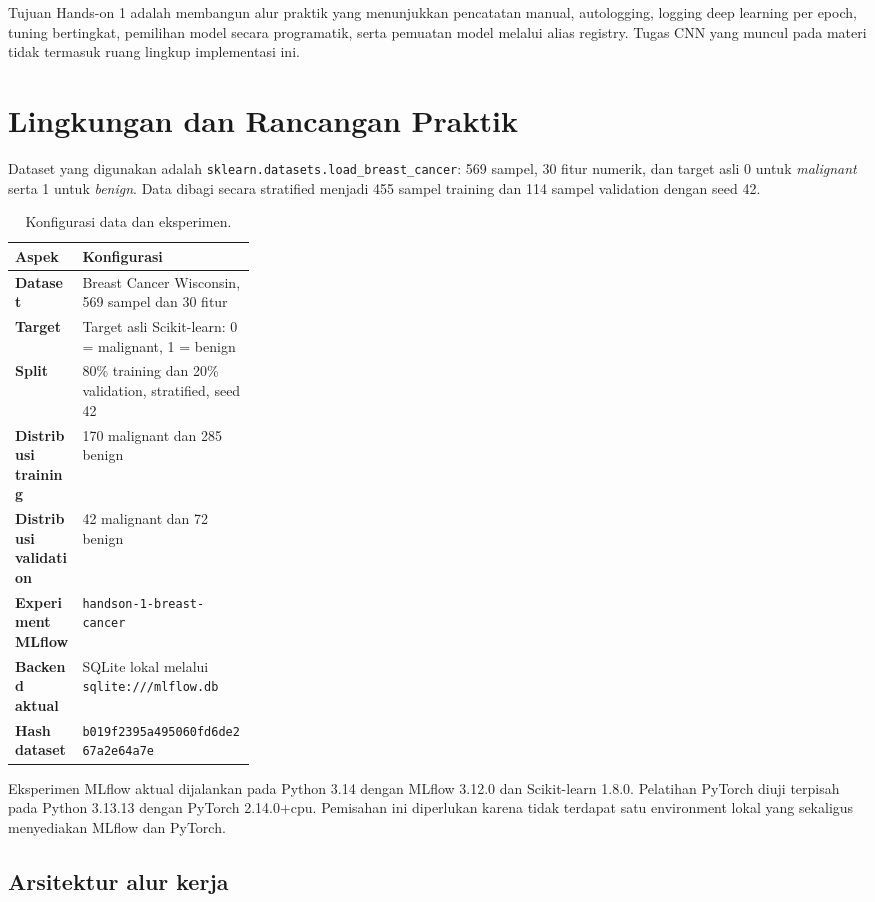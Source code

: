 \documentclass[11pt,a4paper]{article}
\begin{document}
Tujuan Hands-on 1 adalah membangun alur praktik yang menunjukkan pencatatan manual, autologging, logging deep learning per epoch, tuning bertingkat, pemilihan model secara programatik, serta pemuatan model melalui alias registry. Tugas CNN yang muncul pada materi tidak termasuk ruang lingkup implementasi ini.

\section{Lingkungan dan Rancangan Praktik}

Dataset yang digunakan adalah \texttt{sklearn.datasets.load\_breast\_cancer}: 569 sampel, 30 fitur numerik, dan target asli 0 untuk \emph{malignant} serta 1 untuk \emph{benign}. Data dibagi secara stratified menjadi 455 sampel training dan 114 sampel validation dengan seed 42.

\begin{table}[ht]
\centering
\caption{Konfigurasi data dan eksperimen.}
\begin{tabularx}{\linewidth}{>{\bfseries}p{0.28\linewidth}X}
\toprule
Aspek & Konfigurasi \\
\midrule
Dataset & Breast Cancer Wisconsin, 569 sampel dan 30 fitur \\
Target & Target asli Scikit-learn: 0 = malignant, 1 = benign \\
Split & 80\% training dan 20\% validation, stratified, seed 42 \\
Distribusi training & 170 malignant dan 285 benign \\
Distribusi validation & 42 malignant dan 72 benign \\
Experiment MLflow & \texttt{handson-1-breast-cancer} \\
Backend aktual & SQLite lokal melalui \texttt{sqlite:///mlflow.db} \\
Hash dataset & \texttt{b019f2395a495060fd6de267a2e64a7e} \\
\bottomrule
\end{tabularx}
\end{table}

Eksperimen MLflow aktual dijalankan pada Python 3.14 dengan MLflow 3.12.0 dan Scikit-learn 1.8.0. Pelatihan PyTorch diuji terpisah pada Python 3.13.13 dengan PyTorch 2.14.0+cpu. Pemisahan ini diperlukan karena tidak terdapat satu environment lokal yang sekaligus menyediakan MLflow dan PyTorch.

\subsection{Arsitektur alur kerja}
\end{document}
